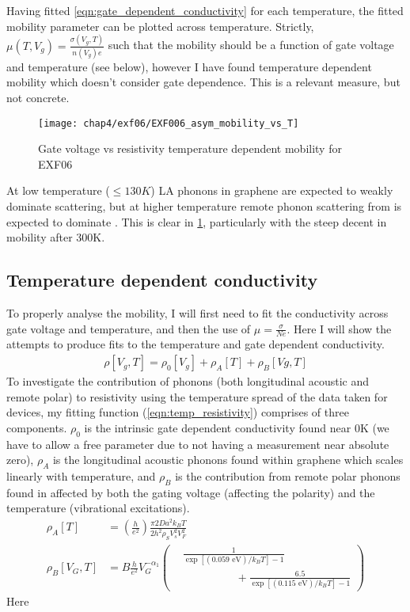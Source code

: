 \documentclass[../Matt_Gebert_Honours_Thesis.tex]{subfiles}
\begin{document}
Having fitted \cref{eqn:gate_dependent_conductivity} for each temperature, the fitted mobility parameter can be plotted across temperature. Strictly, $\mu(T,V_g) = \frac{\sigma(V_g,T)}{n(V_g) e }$ such that the mobility should be a function of gate voltage and temperature (see below), however I have found temperature dependent mobility which doesn't consider gate dependence. This is a relevant measure, but not concrete.
\begin{figure}[H]
	\centering
	\texttt{[image: chap4/exf06/EXF006\_asym\_mobility\_vs\_T]}
	\caption{Gate voltage  vs resistivity temperature dependent mobility for EXF06}\label{fig:temp_mobility}
\end{figure}

At low temperature  ($\leq 130K$) LA phonons in graphene are expected to weakly dominate scattering, but at higher temperature remote phonon scattering from \silicondioxide{} is expected to dominate \cite{chen_intrinsic_2008}. This is clear in \cref{fig:temp_mobility}, particularly with the steep decent in mobility after 300K.

\subsection{Temperature dependent conductivity}
To properly analyse the mobility, I will first need to fit the conductivity across gate voltage and temperature, and then the use of $\mu = \frac{\sigma}{N e}$. Here I will show the attempts to produce fits to the temperature and gate dependent conductivity.
\begin{align}
\rho[V_g,T] = \rho_0[V_g] + \rho_A[T] + \rho_B[Vg,T] \label{eqn:temp_resistivity}
\end{align}
To investigate the contribution of phonons (both longitudinal acoustic and remote polar) to resistivity using the temperature spread of the data taken for devices, my fitting function (\cref{eqn:temp_resistivity}) comprises of three components. $\rho_0$ is the intrinsic gate dependent conductivity found near 0K (we have to allow a free parameter due to not having a measurement near absolute zero), $\rho_A$ is the longitudinal acoustic phonons found within graphene which scales linearly with temperature, and $\rho_B$ is the contribution from remote polar phonons found in \silicondioxide{} affected by both the gating voltage (affecting the polarity) and the temperature (vibrational excitations).
\begin{align}
\rho_A[T] &= \left(\frac{h}{e^2}\right) \frac{\pi2 Da^2 k_B T}{2 h^2 \rho_S V_s^2 V_F^2}\\
\rho_B[V_G,T]&= B \frac{h}{e^2} V_G^{-\alpha_1} \left(\begin{aligned}
&\frac{1}{\exp\left[(0.059\text{ eV})/k_B T\right]-1}\\ &\hspace{2cm}+\frac{6.5}{\exp\left[(0.115\text{ eV})/k_B T\right]-1}
\end{aligned}\right)
\end{align}
Here 
\end{document}
